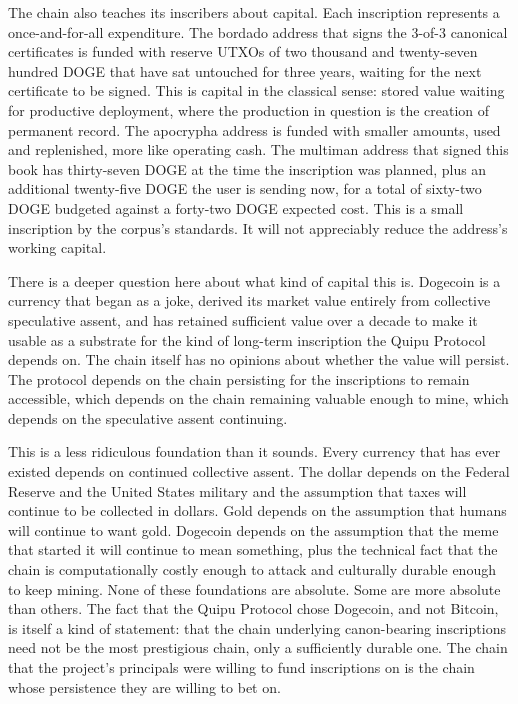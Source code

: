 \documentclass[11pt,openany]{book}
\begin{document}
The chain also teaches its inscribers about capital. Each inscription represents a once-and-for-all expenditure. The bordado address that signs the 3-of-3 canonical certificates is funded with reserve UTXOs of two thousand and twenty-seven hundred DOGE that have sat untouched for three years, waiting for the next certificate to be signed. This is capital in the classical sense: stored value waiting for productive deployment, where the production in question is the creation of permanent record. The apocrypha address is funded with smaller amounts, used and replenished, more like operating cash. The multiman address that signed this book has thirty-seven DOGE at the time the inscription was planned, plus an additional twenty-five DOGE the user is sending now, for a total of sixty-two DOGE budgeted against a forty-two DOGE expected cost. This is a small inscription by the corpus's standards. It will not appreciably reduce the address's working capital.

There is a deeper question here about what kind of capital this is. Dogecoin is a currency that began as a joke, derived its market value entirely from collective speculative assent, and has retained sufficient value over a decade to make it usable as a substrate for the kind of long-term inscription the Quipu Protocol depends on. The chain itself has no opinions about whether the value will persist. The protocol depends on the chain persisting for the inscriptions to remain accessible, which depends on the chain remaining valuable enough to mine, which depends on the speculative assent continuing.

This is a less ridiculous foundation than it sounds. Every currency that has ever existed depends on continued collective assent. The dollar depends on the Federal Reserve and the United States military and the assumption that taxes will continue to be collected in dollars. Gold depends on the assumption that humans will continue to want gold. Dogecoin depends on the assumption that the meme that started it will continue to mean something, plus the technical fact that the chain is computationally costly enough to attack and culturally durable enough to keep mining. None of these foundations are absolute. Some are more absolute than others. The fact that the Quipu Protocol chose Dogecoin, and not Bitcoin, is itself a kind of statement: that the chain underlying canon-bearing inscriptions need not be the most prestigious chain, only a sufficiently durable one. The chain that the project's principals were willing to fund inscriptions on is the chain whose persistence they are willing to bet on.
\end{document}

